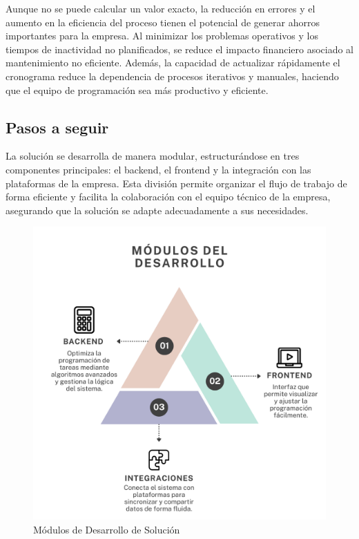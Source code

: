 \documentclass{article}
\begin{document}
Aunque no se puede calcular un valor exacto, la reducción en errores y el aumento en la eficiencia del proceso tienen el potencial de generar ahorros importantes para la empresa. Al minimizar los problemas operativos y los tiempos de inactividad no planificados, se reduce el impacto financiero asociado al mantenimiento no eficiente. Además, la capacidad de actualizar rápidamente el cronograma reduce la dependencia de procesos iterativos y manuales, haciendo que el equipo de programación sea más productivo y eficiente.

\subsection{Pasos a seguir}

La solución se desarrolla de manera modular, estructurándose en tres componentes principales: el backend, el frontend y la integración con las plataformas de la empresa. Esta división permite organizar el flujo de trabajo de forma eficiente y facilita la colaboración con el equipo técnico de la empresa, asegurando que la solución se adapte adecuadamente a sus necesidades.

\begin{figure}[htbp]
  \centering
  \includegraphics[scale=0.3]{imgs/ModulosDesarrollo.png}
  \caption{Módulos de Desarrollo de Solución}
  \label{fig:modulos-desarrollo}
\end{figure}
\end{document}
